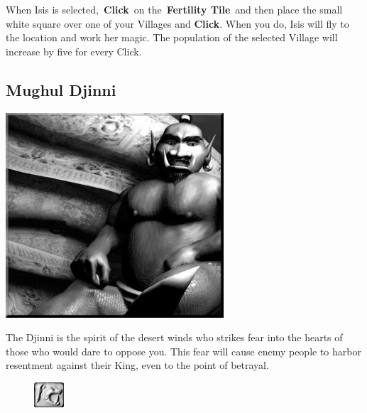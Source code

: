 When Isis is selected, \textbf{Click} on the \textbf{Fertility Tile} and then place the small white square over one of your Villages and \textbf{Click}. When you do, Isis will fly to the location and work her magic. The population of the selected Village will increase by five for every Click.

\subsection{Mughul Djinni}

\begin{center}
	\includegraphics[width=1\linewidth]{Adjinni}
\end{center}

The Djinni is the spirit of the desert winds who strikes fear into the hearts of those who would dare to oppose you. This fear will cause enemy people to harbor resentment against their King, even to the point of betrayal.

\begin{figure}
	\vspace{-20pt}
	\begin{center}
		\includegraphics[width=0.1\textwidth]{Tdjinni}
	\end{center}
	\vspace{-20pt}
\end{figure}


